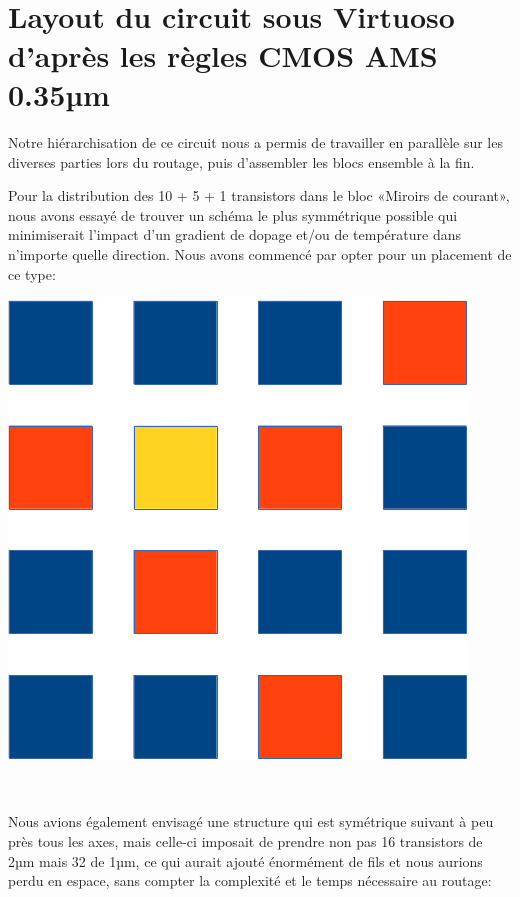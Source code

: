 \documentclass{article}
\begin{document}
~

\newpage

\section{Layout du circuit sous Virtuoso d’après les règles CMOS AMS 0.35µm}

Notre hiérarchisation de ce circuit nous a permis de travailler en parallèle sur les diverses parties lors du routage, puis d’assembler les blocs ensemble à la fin.

\begin{multicols}{2}
    Pour la distribution des 10 + 5 + 1 transistors dans le bloc «Miroirs de courant», nous avons essayé de trouver un schéma le plus symmétrique possible qui minimiserait l’impact d’un gradient de dopage et/ou de température dans n’importe quelle direction. Nous avons commencé par opter pour un placement de ce type:

    \includegraphics[width=\linewidth-1cm]{placement_mirroirs.png}


    ~

    Nous avions également envisagé une structure qui est symétrique suivant à peu près tous les axes, mais celle-ci imposait de prendre non pas 16 transistors de 2µm mais 32 de 1µm, ce qui aurait ajouté énormément de fils et nous aurions perdu en espace, sans compter la complexité et le temps nécessaire au routage:


\end{multicols}
\end{document}
